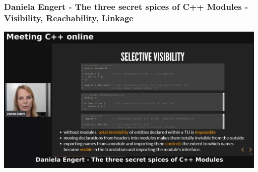 \documentclass[aspectratio=169]{beamer}
\begin{document}
\begin{frame}
  \frametitle{Daniela Engert - The three secret spices of C++ Modules - \\ Visibility, Reachability, Linkage}
  \begin{center}
    \href{https://www.youtube.com/watch?v=l_83lyxWGtE}
    {\includegraphics[height=.8\textheight]{modulesgfx/engert_three_spices.jpg}}
  \end{center}
\end{frame}
\end{document}
